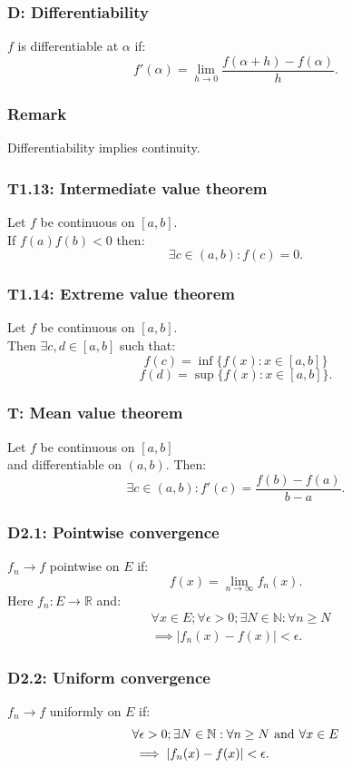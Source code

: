 \documentclass{article}
\begin{document}
\begin{multicols*}{3}
\subsubsection*{D: Differentiability}
$f$ is differentiable at $\alpha$ if:
$$f'(\alpha)=\lim_{h\rightarrow0}
\frac{f(\alpha+h)-f(\alpha)}{h}.$$

\subsubsection*{Remark}
Differentiability implies continuity.

\subsubsection*{T1.13: Intermediate value theorem}
Let $f$ be continuous on $[a,b]$. \\
If $f(a)f(b)<0$ then:
$$\exists c\in(a,b):f(c)=0.$$

\subsubsection*{T1.14: Extreme value theorem}
Let $f$ be continuous on $[a,b]$. \\
Then $\exists c,d\in[a,b]$ such that:
$$f(c)=\inf\{f(x):x\in[a,b]\}$$
$$f(d)=\sup\{f(x):x\in[a,b]\}.$$

\subsubsection*{T: Mean value theorem}
Let $f$ be continuous on $[a,b]$ \\
and differentiable on $(a,b)$.
Then:
$$\exists c\in(a,b):f'(c)=\frac{f(b)-f(a)}{b-a}.$$

\subsubsection*{D2.1: Pointwise convergence}
$f_n\rightarrow f$ pointwise on $E$ if:
$$f(x)=\lim_{n\rightarrow\infty}f_n(x).$$
Here $f_n:E\rightarrow\mathbb{R}$ and:
\begin{align*}
    &\forall x\in E;\forall\epsilon>0;
    \exists N\in\mathbb{N}:\forall n\geq N \\
    &\implies |f_n(x)-f(x)|<\epsilon.
\end{align*}

\subsubsection*{D2.2: Uniform convergence}
$f_n\rightarrow f$ uniformly on $E$ if:
\begin{align*}
    &\forall\epsilon>0;
    \exists N\in\mathbb{N}:\forall n\geq N
    \hspace{0.05in}\text{and}\hspace{0.05in}
    \forall x\in E \\
    &\implies |f_n(x)-f(x)|<\epsilon.
\end{align*}


\end{multicols*}
\end{document}
